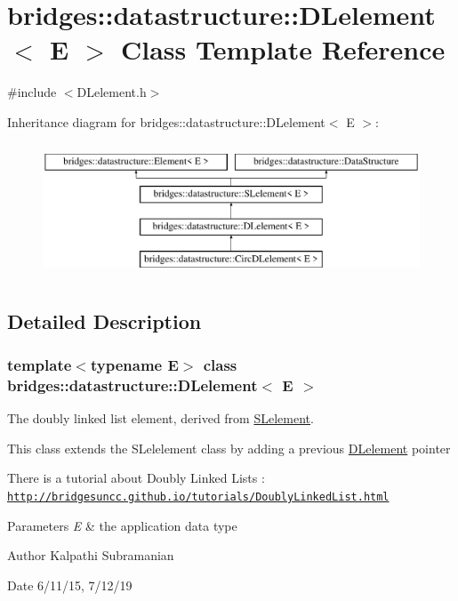 \hypertarget{classbridges_1_1datastructure_1_1_d_lelement}{}\section{bridges\+:\+:datastructure\+:\+:D\+Lelement$<$ E $>$ Class Template Reference}
\label{classbridges_1_1datastructure_1_1_d_lelement}


{\ttfamily \#include $<$D\+Lelement.\+h$>$}

Inheritance diagram for bridges\+:\+:datastructure\+:\+:D\+Lelement$<$ E $>$\+:\begin{figure}[H]
\begin{center}
\leavevmode
\includegraphics[height=4.000000cm]{classbridges_1_1datastructure_1_1_d_lelement}
\end{center}
\end{figure}


\subsection{Detailed Description}
\subsubsection*{template$<$typename E$>$\newline
class bridges\+::datastructure\+::\+D\+Lelement$<$ E $>$}

The doubly linked list element, derived from \hyperlink{classbridges_1_1datastructure_1_1_s_lelement}{S\+Lelement}. 

This class extends the S\+Lelelement class by adding a previous \hyperlink{classbridges_1_1datastructure_1_1_d_lelement}{D\+Lelement} pointer

There is a tutorial about Doubly Linked Lists \+: \href{http://bridgesuncc.github.io/tutorials/DoublyLinkedList.html}{\tt http\+://bridgesuncc.\+github.\+io/tutorials/\+Doubly\+Linked\+List.\+html}


\begin{DoxyParams}{Parameters}
{\em E} & the application data type\\
\hline
\end{DoxyParams}
\begin{DoxyAuthor}{Author}
Kalpathi Subramanian 
\end{DoxyAuthor}
\begin{DoxyDate}{Date}
6/11/15, 7/12/19 
\end{DoxyDate}
